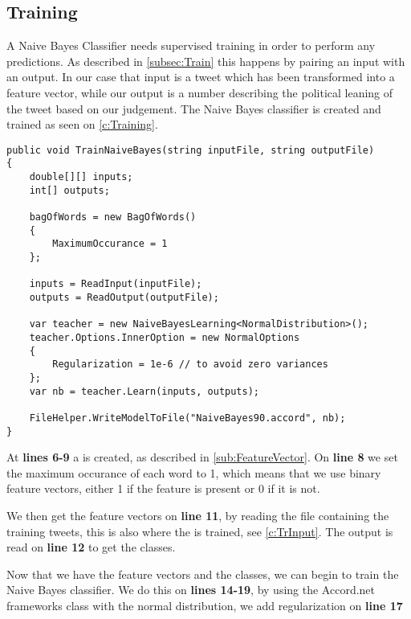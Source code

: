 \subsection{Training}
A Naive Bayes Classifier needs supervised training in order to perform any
predictions. As described in \autoref{subsec:Train} this happens by pairing an
input with an output. In our case that input is a tweet which has been
transformed into a feature vector, while our output is a number describing the political
leaning of the tweet based on our judgement. The Naive Bayes classifier is
created and trained as seen on \autoref{c:Training}.\nl

\begin{minipage}[H]{\linewidth}
\begin{lstlisting}[caption = Creating and training the classifier, label =
c:Training] 
public void TrainNaiveBayes(string inputFile, string outputFile)
{
    double[][] inputs;
    int[] outputs;

    bagOfWords = new BagOfWords()
    {
        MaximumOccurance = 1
    };

    inputs = ReadInput(inputFile);
    outputs = ReadOutput(outputFile);

    var teacher = new NaiveBayesLearning<NormalDistribution>();
    teacher.Options.InnerOption = new NormalOptions
    {
        Regularization = 1e-6 // to avoid zero variances
    };
    var nb = teacher.Learn(inputs, outputs);

    FileHelper.WriteModelToFile("NaiveBayes90.accord", nb);
}
\end{lstlisting}
\end{minipage}

At \textbf{lines 6-9} a  is created, as described in
\autoref{sub:FeatureVector}. On \textbf{line 8} we set the maximum occurance of
each word to 1, which means that we use binary feature vectors, either 1 if
the feature is present or 0 if it is not.

We then get the feature vectors on \textbf{line 11}, by reading the file
containing the training tweets, this is also where the  is
trained, see \autoref{c:TrInput}. The output is read on \textbf{line 12} to get
the classes.

Now that we have the feature vectors and the classes, we can begin to train the
Naive Bayes classifier. We do this on \textbf{lines 14-19}, by using the
Accord.net frameworks  class with the normal
distribution, we add regularization on \textbf{line 17} 

